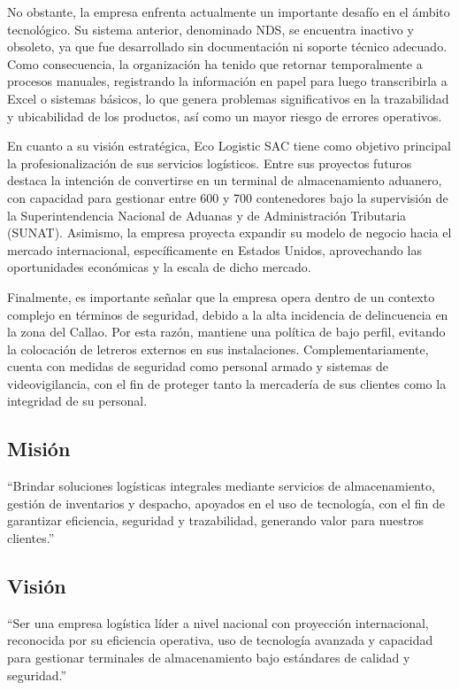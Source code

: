 \documentclass[11pt]{article}
\begin{document}
No obstante, la empresa enfrenta actualmente un importante desafío en el
ámbito tecnológico. Su sistema anterior, denominado NDS, se encuentra
inactivo y obsoleto, ya que fue desarrollado sin documentación ni
soporte técnico adecuado. Como consecuencia, la organización ha tenido
que retornar temporalmente a procesos manuales, registrando la
información en papel para luego transcribirla a Excel o sistemas
básicos, lo que genera problemas significativos en la trazabilidad y
ubicabilidad de los productos, así como un mayor riesgo de errores
operativos.

En cuanto a su visión estratégica, Eco Logistic SAC tiene como objetivo
principal la profesionalización de sus servicios logísticos. Entre sus
proyectos futuros destaca la intención de convertirse en un terminal de
almacenamiento aduanero, con capacidad para gestionar entre 600 y 700
contenedores bajo la supervisión de la Superintendencia Nacional de
Aduanas y de Administración Tributaria (SUNAT). Asimismo, la empresa
proyecta expandir su modelo de negocio hacia el mercado internacional,
específicamente en Estados Unidos, aprovechando las oportunidades
económicas y la escala de dicho mercado.

Finalmente, es importante señalar que la empresa opera dentro de un
contexto complejo en términos de seguridad, debido a la alta incidencia
de delincuencia en la zona del Callao. Por esta razón, mantiene una
política de bajo perfil, evitando la colocación de letreros externos en
sus instalaciones. Complementariamente, cuenta con medidas de seguridad
como personal armado y sistemas de videovigilancia, con el fin de
proteger tanto la mercadería de sus clientes como la integridad de su
personal.

\subsection{Misión}

``Brindar soluciones logísticas integrales mediante servicios de
almacenamiento, gestión de inventarios y despacho, apoyados en el uso de
tecnología, con el fin de garantizar eficiencia, seguridad y
trazabilidad, generando valor para nuestros clientes.''

\subsection{Visión}

``Ser una empresa logística líder a nivel nacional con proyección
internacional, reconocida por su eficiencia operativa, uso de tecnología
avanzada y capacidad para gestionar terminales de almacenamiento bajo
estándares de calidad y seguridad.''
\end{document}
